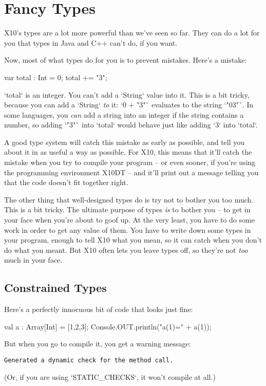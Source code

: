 \chapter{Fancy Types}

X10's types are a lot more powerful than we've seen so far.  They can do a lot
for you that types in Java and C++ can't do, if you want.   

Now, most of what types do for you is to prevent mistakes.  Here's a mistake: 
\begin{xten}
var total : Int = 0; 
total += "3";
\end{xten}
\xcd`total` is an integer.  You can't add a \xcd`String` value into it. 
This is a bit tricky, because you can add a \xcd`String` {\em to} it: 
\xcd`0 + "3"` evaluates to the string \xcd`"03"`.  In some languages, you {\em
can} add a string into an integer if the string contains a number, so adding
\xcd`"3"` into \xcd`total` would behave just like adding \xcd`3` into
\xcd`total`.  

A good type system will catch this mistake as early as possible, and tell you
about it in as useful a way as possible.  For X10, this means that it'll catch
the mistake when you try to compile your program -- or even sooner, if you're
using the programming environment X10DT -- and it'll print out a message
telling you that the code doesn't fit together right.   

The other thing that well-designed types do is try not to bother you too much.
This is a bit tricky. The ultimate purpose of types {\em is} to bother you --
to get in your face when you're about to goof up. At the very least, you have
to do some work in order to get any value of them. You have to write down some
types in your program, enough to tell X10 what you mean, so it can catch when
you don't do what you meant.  But X10 often lets you leave types off, so
they're not {\em too} much in your face.




\section{Constrained Types}

Here's a perfectly innocuous bit of code that looks just fine: 
\begin{xtennum}[]
val a : Array[Int] = [1,2,3];
Console.OUT.println("a(1)=" + a(1));
\end{xtennum}
But when you go to compile it, you get a warning message: 
\begin{verbatim}
Generated a dynamic check for the method call.
\end{verbatim}
(Or, if you are using \xcd`STATIC_CHECKS`, it won't compile at all.)  

